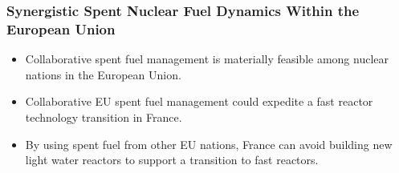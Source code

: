 \begin{frame}
        \frametitle{Synergistic Spent Nuclear Fuel Dynamics Within the European 
        Union}
\begin{itemize}
       \item Collaborative spent fuel management is materially feasible among nuclear
               nations in the  European Union.
       \item Collaborative EU spent fuel management could expedite a fast reactor
               technology transition in France.
       \item By using spent fuel from other EU nations, France can avoid
               building new light water reactors to support a transition to
               fast reactors.
\end{itemize}
\end{frame}


